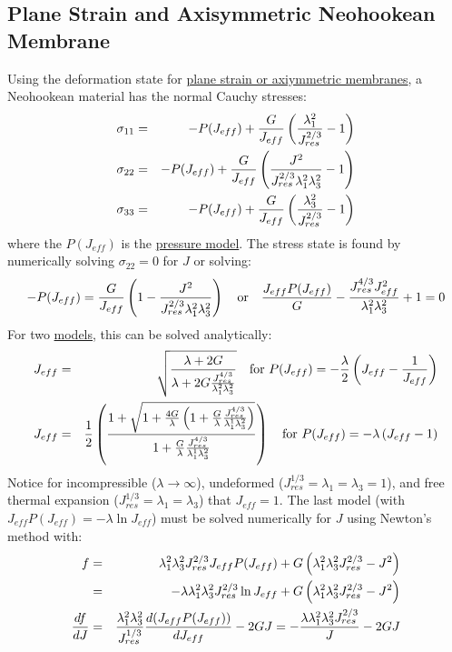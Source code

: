 \documentclass[11pt]{book}
\def\Jeff{J_{eff}}
\def\Jres{J_{res}}
\begin{document}
\subsection{Plane Strain and Axisymmetric Neohookean Membrane}

Using the deformation state for \hyperref[MMT]{plane strain or axiymmetric membranes}, a Neohookean material has the normal Cauchy stresses:
\begin{eqnarray}
      \sigma_{11} & = & -P(\Jeff) + {G\over\Jeff}\left({\lambda_1^2\over\Jres^{2/3}}-1\right) \\
      \sigma_{22} & = & -P(\Jeff) + {G\over\Jeff}\left({J^2\over\Jres^{2/3}\lambda_1^2\lambda_3^2}-1\right) \\
      \sigma_{33} & = & -P(\Jeff) + {G\over\Jeff}\left({\lambda_3^2\over\Jres^{2/3}}-1\right)
\end{eqnarray}
where the $P(\Jeff)$ is the \hyperref[PTerms]{pressure model}. The stress state is found by numerically solving $\sigma_{22}=0$ for $J$ or solving:
\begin{equation}
	-P(\Jeff) =  {G\over\Jeff}\left(1 - {J^2\over\Jres^{2/3}\lambda_1^2\lambda_3^2}\right) 
	\quad{\rm or}\quad {\Jeff P(\Jeff)\over  G} - {\Jres^{4/3}\Jeff^2\over\lambda_1^2\lambda_3^2} +1 = 0
\end{equation}
For two \hyperref[PTerms]{models}, this can be solved analytically:
\begin{eqnarray}
   \Jeff & = & \sqrt{\lambda+2G\over \lambda + 2G{\Jres^{4/3}\over\lambda_1^2\lambda_3^2}}
                                    \quad{\rm for}\ P(\Jeff) = -{\lambda\over2}\left(\Jeff - {1\over\Jeff}\right) \\
   \Jeff & = & {1\over 2}\left({1+\sqrt{1+{4G\over\lambda}\left(1 + {G\over\lambda}{\Jres^{4/3}\over\lambda_1^1\lambda_3^2}\right)} 
                           \over 1 + {G\over\lambda}{\Jres^{4/3}\over\lambda_1^1\lambda_3^2} } \right)
                                    \quad{\rm for}\ P(\Jeff) = -\lambda\left(\Jeff - 1\right) 
\end{eqnarray}
Notice for incompressible ($\lambda\to\infty$), undeformed ($\Jres^{1/3}=\lambda_1=\lambda_3=1$), and free thermal expansion ($\Jres^{1/3}=\lambda_1=\lambda_3$) that $\Jeff = 1$.
The last model (with $\Jeff P(\Jeff) = -\lambda \ln \Jeff$) must be solved numerically for $J$ using Newton's method with:
\begin{eqnarray}
	f & = & \lambda_1^2\lambda_3^2\Jres^{2/3}\Jeff P(\Jeff) +  G\left(\lambda_1^2\lambda_3^2\Jres^{2/3}-J^2\right) \\
	       & = & -\lambda\lambda_1^2\lambda_3^2\Jres^{2/3}\ln\Jeff +  G\left(\lambda_1^2\lambda_3^2\Jres^{2/3}-J^2\right)\\
	{df\over dJ} & = & {\lambda_1^2\lambda_3^2\over\Jres^{1/3}}{d(\Jeff P(\Jeff))\over d\Jeff} - 2GJ
	           = -{\lambda\lambda_1^2\lambda_3^2\Jres^{2/3}\over J} - 2GJ
\end{eqnarray}
\end{document}
